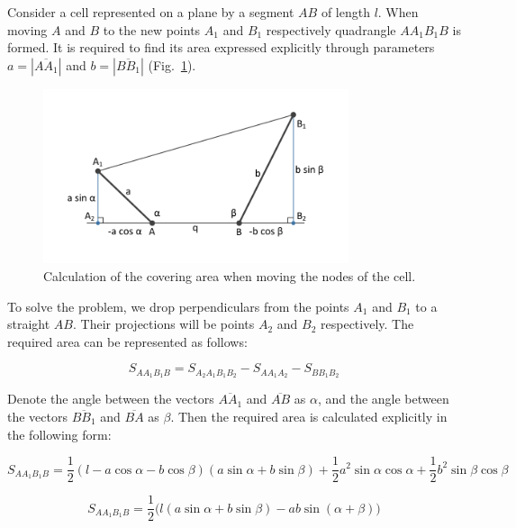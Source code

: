 Consider a cell represented on a plane by a segment $AB$ of length $l$.
When moving $A$ and $B$ to the new points $A_1$ and $B_1$ respectively quadrangle $AA_1B_1B$ is formed.
It is required to find its area expressed explicitly through parameters $a = |\overline{AA_1}|$ and $b = |\overline{BB_1}|$ (Fig.~\ref{fig:local}).

\begin{figure}[h]
\onelinecaptionstrue
\centering
\includegraphics[width=0.8\textwidth]{pics/text_1_remesh_2d/local.pdf}
\caption{Calculation of the covering area when moving the nodes of the cell.}
\label{fig:local}
\end{figure}

To solve the problem, we drop perpendiculars from the points $A_1$ and $B_1$ to a straight $AB$.
Their projections will be points $A_2$ and $B_2$ respectively.
The required area can be represented as follows:

\begin{equation}
S_{AA_1B_1B} = S_{A_2A_1B_1B_2} - S_{AA_1A_2} - S_{BB_1B_2}
\end{equation}

Denote the angle between the vectors $\overline{AA_1}$ and $\overline{AB}$ as $\alpha$, and the angle between the vectors $\overline{BB_1}$ and $\overline{BA}$ as $\beta$.
Then the required area is calculated explicitly in the following form:

\begin{equation}
S_{AA_1B_1B} = \frac{1}{2}(l - a \cos \alpha - b \cos \beta)(a \sin \alpha + b \sin \beta) + \frac{1}{2}a^2 \sin \alpha \cos \alpha + \frac{1}{2}b^2 \sin \beta \cos \beta
\end{equation}

\begin{equation}
S_{AA_1B_1B} = \frac{1}{2}\big(l(a \sin \alpha + b \sin \beta) - ab \sin(\alpha + \beta)\big)
\end{equation}

